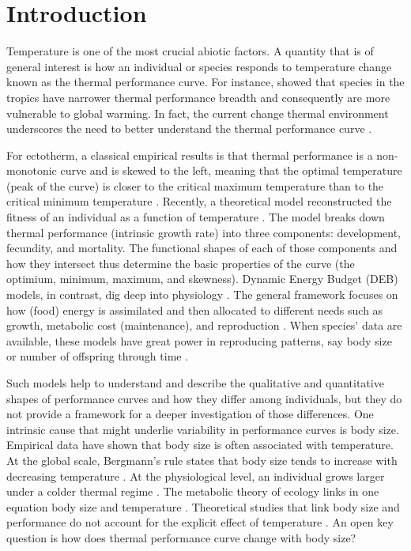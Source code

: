 \section*{Introduction}
Temperature is one of the most crucial abiotic factors.
A quantity that is of general interest is how an individual or species responds to temperature change known as the thermal performance curve.
For instance, \citep{Deutsch2008} showed that species in the tropics have narrower thermal performance breadth and consequently are more vulnerable  to global warming.
In fact, the current change thermal environment underscores the need to better understand the thermal performance curve .

For ectotherm, a classical empirical results is that thermal performance is a non-monotonic curve and is skewed to the left, meaning that the optimal temperature (peak of the curve) is closer to the critical maximum temperature than to the critical minimum temperature \citep[e.g.,][]{Angilletta2009}.
Recently, a theoretical model reconstructed the fitness of an individual as a function of temperature \citep{Amarasekare2012}.
The model  breaks down thermal performance (intrinsic growth rate)  into three components: development, fecundity, and mortality.
The functional shapes of each of those components and how they intersect thus determine the basic properties of the curve (the optimium, minimum, maximum, and skewness).
Dynamic Energy Budget (DEB) models, in contrast, dig deep into physiology \citep{Kooijman2009}.
The general framework focuses on how (food) energy is assimilated and then allocated to different needs such as growth, metabolic cost (maintenance), and reproduction \citep{Kooijman2009}.
When species'  data are available, these models have great power in reproducing patterns, say body size or number of offspring through time \citep{Nisbet2000}.

Such models help to understand and describe the qualitative and quantitative shapes of performance curves and how they differ among individuals, but they do not provide a framework for a deeper investigation of those differences.
One intrinsic cause that might underlie variability in performance curves is body size.
Empirical data have shown that body size is often associated with temperature.
At the global scale, Bergmann's rule states that body size tends to increase with decreasing temperature \citep{Bergmann1847}.
At the physiological level, an individual grows larger under a colder thermal regime \citep{Van1996}.
The metabolic theory of ecology links in one equation body size and temperature \citep{Gillooly2001}.
Theoretical studies that link body size and performance do not account for the explicit effect of temperature \citep[e.g.,][]{Yodzis1992, Brown1993}.
An open key question is how does thermal performance curve change with body size?

